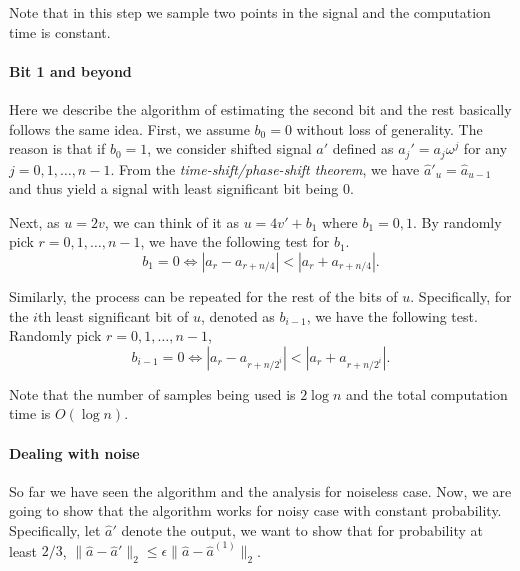 \documentclass[11pt]{article}
\begin{document}
Note that in this step we sample two points in the signal and the computation time is constant.

\paragraph{Bit 1 and beyond}
Here we describe the algorithm of estimating the second bit and the rest basically follows the same idea. First, we assume $b_0=0$ without loss of generality. The reason is that if $b_0=1$, we consider shifted signal $a'$ defined as $a_j'=a_j\omega^j$ for any $j=0,1,\dots,n-1$. From the \textit{time-shift/phase-shift theorem}, we have $\hat{a}'_u=\hat{a}_{u-1}$ and thus yield a signal with least significant bit being $0$.

Next, as $u=2v$, we can think of it as $u=4v'+b_1$ where $b_1=0,1$. By randomly pick $r=0,1,\dots,n-1$, we have the following test for $b_1$.
\begin{equation*}
b_1=0\Leftrightarrow|a_r-a_{r+n/4}|<|a_r+a_{r+n/4}|.
\end{equation*}

Similarly, the process can be repeated for the rest of the bits of $u$. Specifically, for the $i$th least significant bit of $u$, denoted as $b_{i-1}$, we have the following test. Randomly pick $r=0,1,\dots,n-1$,
\begin{equation*}
b_{i-1}=0\Leftrightarrow|a_r-a_{r+n/2^i}|<|a_r+a_{r+n/2^i}|.
\end{equation*}

Note that the number of samples being used is $2\log n$ and the total computation time is $O(\log n)$.


\paragraph{Dealing with noise}
So far we have seen the algorithm and the analysis for noiseless case. Now, we are going to show that the algorithm works for noisy case with constant probability. Specifically, let $\hat{a}'$ denote the output, we want to show that for probability at least $2/3$, $\|\hat{a}-\hat{a}'\|_2\leq\epsilon\|\hat{a}-\hat{a}^{(1)}\|_2$.
\end{document}
